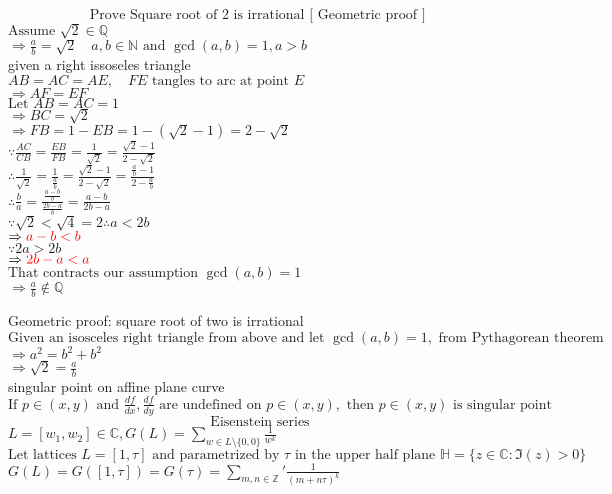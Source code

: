 \documentclass[10pt]{article}
\begin{document}
\pagebreak
\noindent
\[ \text{Prove Square root of 2 is irrational} \text{ [ Geometric proof ] }\]
$\text{Assume } \sqrt{2} \in \mathbb{Q}$\\
$\Rightarrow \frac{a}{b} = \sqrt{2} \quad a, b \in \mathbb{N} \text{ and } \gcd(a, b) = 1, a > b$\\

given a right issoseles triangle\\
$AB = AC = AE, \quad FE \text{  tangles to arc at point } E $\\
$\Rightarrow AF = EF$\\
$\text{Let } AB = AC = 1$\\
$\Rightarrow BC = \sqrt{2}$\\
$\Rightarrow FB = 1-EB = 1-(\sqrt{2} - 1) = 2-\sqrt{2}$\\
$\because \frac{AC}{CB} = \frac{EB}{FB} = \frac{1}{\sqrt{2}} = \frac{\sqrt{2}-1}{2-\sqrt{2}}$\\
$\therefore \frac{1}{\sqrt{2}} =\frac{1}{\frac{a}{b}} = \frac{\sqrt{2}-1}{2-\sqrt{2}} = \frac{\frac{a}{b} - 1}{2-\frac{a}{b}}$\\
$\therefore \frac{b}{a} = \frac{ \frac{a-b}{b} } {\frac{2b - a}{b}} = \frac{a-b}{2b-a}$\\
$\because \sqrt{2} < \sqrt{4} = 2 \therefore  a < 2b $\\
$\Rightarrow  \color{red} a-b < b $\\
$\because 2a > 2b$\\
$\Rightarrow  \color{red}2b -a < a$\\
$\text{That contracts our assumption } \gcd(a, b) = 1$\\
$\Rightarrow \frac{a}{b} \notin \mathbb{Q}$

\pagebreak
\noindent
Geometric proof: square root of two is irrational\\
$\text{Given an isosceles right triangle from above and let } \gcd(a, b)=1, \text{ from Pythagorean theorem}$\\
$\Rightarrow a^2 = b^2 + b^2$\\
$\Rightarrow \sqrt{2} = \frac{a}{b}$\\

singular point on affine plane curve\\
$\text{If } p \in (x, y) \text{ and } \frac{df}{dx}, \frac{df}{dy} \text{ are undefined on } p \in (x, y), \text{ then } p\in (x, y) \text{ is singular point}$\\


\[\text{Eisenstein series}\]
$L = [w_1, w_2] \in \mathbb{C}, G(L) = \sum_{w\in L\setminus \{0, 0\}} \frac{1}{w^k}$\\
$\text{Let lattices } L=[1, \tau] \text{ and parametrized by }\tau  \text{ in the upper half plane } \mathbb{H} = \{ z \in\mathbb{C} : \Im(z) > 0 \} $\\
$G(L) = G([1, \tau]) =G(\tau) = \sum_{m, n \in \mathbb{Z}}' \frac{1}{(m+n\tau)^k}$\\
\end{document}
